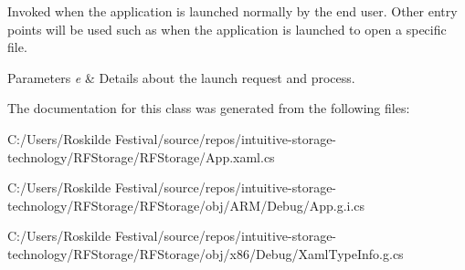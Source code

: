 Invoked when the application is launched normally by the end user. Other entry points will be used such as when the application is launched to open a specific file. 


\begin{DoxyParams}{Parameters}
{\em e} & Details about the launch request and process.\\
\hline
\end{DoxyParams}


The documentation for this class was generated from the following files\+:\begin{DoxyCompactItemize}
\item 
C\+:/\+Users/\+Roskilde Festival/source/repos/intuitive-\/storage-\/technology/\+R\+F\+Storage/\+R\+F\+Storage/App.\+xaml.\+cs\item 
C\+:/\+Users/\+Roskilde Festival/source/repos/intuitive-\/storage-\/technology/\+R\+F\+Storage/\+R\+F\+Storage/obj/\+A\+R\+M/\+Debug/App.\+g.\+i.\+cs\item 
C\+:/\+Users/\+Roskilde Festival/source/repos/intuitive-\/storage-\/technology/\+R\+F\+Storage/\+R\+F\+Storage/obj/x86/\+Debug/Xaml\+Type\+Info.\+g.\+cs\end{DoxyCompactItemize}
